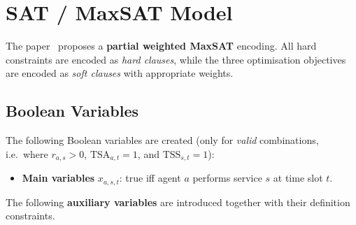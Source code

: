 \documentclass[11pt,a4paper]{article}
\newcommand{\TSA}{\mathrm{TSA}}
\newcommand{\TSS}{\mathrm{TSS}}
\begin{document}
\section{SAT / MaxSAT Model}\label{sec:sat}

The paper~\cite{collcaballero2025hcorap} proposes a \textbf{partial weighted
MaxSAT} encoding.  All hard constraints are encoded as \emph{hard clauses},
while the three optimisation objectives are encoded as \emph{soft clauses} with
appropriate weights.

\subsection{Boolean Variables}

The following Boolean variables are created (only for \emph{valid} combinations,
i.e.\ where $r_{a,s} > 0$, $\TSA_{a,t} = 1$, and $\TSS_{s,t} = 1$):

\begin{itemize}
    \item \textbf{Main variables} $x_{a,s,t}$: true iff agent $a$ performs
          service $s$ at time slot $t$.
\end{itemize}

The following \textbf{auxiliary variables} are introduced together with their
definition constraints.
\end{document}
